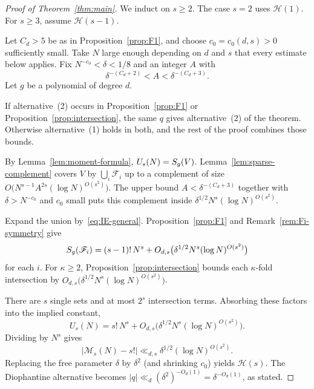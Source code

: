 \begin{proof}[Proof of Theorem~\ref{thm:main}]
We induct on \(s\geq 2\). The case \(s=2\) uses \(\mathcal{H}(1)\). For \(s\geq 3\), assume \(\mathcal{H}(s-1)\).

Let \(C_d>5\) be as in Proposition~\ref{prop:F1}, and choose \(c_0=c_0(d,s)>0\) sufficiently small.  Take \(N\) large enough depending on \(d\) and \(s\) that every estimate below applies.  Fix \(N^{-c_0}<\delta<1/8\) and an integer \(A\) with
\[
\delta^{-(C_d+2)}<A<\delta^{-(C_d+3)}.
\]
Let \(g\) be a polynomial of degree \(d\).

If alternative~(2) occurs in Proposition~\ref{prop:F1} or Proposition~\ref{prop:intersection}, the same $q$ gives alternative~(2) of the theorem.  Otherwise alternative~(1) holds in both, and the rest of the proof combines those bounds.

By Lemma~\ref{lem:moment-formula}, \(U_s(N)=S_g\!\left(V\right)\).  Lemma~\ref{lem:sparse-complement} covers \(V\) by \(\bigcup_i\mathscr{F}_i\) up to a complement of size \(O\bigl(N^{s-1}A^{2s}(\log N)^{O(s^2)}\bigr)\).  The upper bound \(A<\delta^{-(C_d+3)}\) together with \(\delta>N^{-c_0}\) and \(c_0\) small puts this complement inside \(\delta^{1/2} N^s(\log N)^{O(s^2)}\).

Expand the union by~\eqref{eq:IE-general}.  Proposition~\ref{prop:F1} and Remark~\ref{rem:Fi-symmetry} give
\[
S_g\!\left(\mathscr{F}_i\right)=(s-1)!\,N^s+O_{d,s}\bigl(\delta^{1/2} N^s(\log N)^{O(s^2)}\bigr)
\]
for each \(i\).  For \(\kappa\geq 2\), Proposition~\ref{prop:intersection} bounds each \(\kappa\)-fold intersection by \(O_{d,s}\bigl(\delta^{1/2} N^s(\log N)^{O(s^2)}\bigr)\).

There are \(s\) single sets and at most \(2^s\) intersection terms. Absorbing these factors into the implied constant,
\[
U_s(N)=s!\,N^s+O_{d,s}\bigl(\delta^{1/2} N^s(\log N)^{O(s^2)}\bigr).
\]  Dividing by \(N^s\) gives
\[
\bigl|\mathcal{M}_s(N)-s!\bigr|
\ll_{d,s}\delta^{1/2}(\log N)^{O(s^2)}.
\]
Replacing the free parameter $\delta$ by $\delta^2$ (and shrinking $c_0$) yields $\mathcal{H}(s)$.  The Diophantine alternative becomes $|q|\ll_d(\delta^2)^{-O_d(1)}=\delta^{-O_d(1)}$, as stated.
\end{proof}

